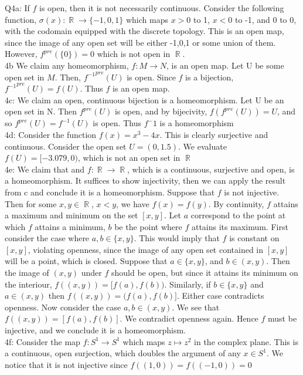 \documentclass[letterpaper]{article}
\DeclareMathOperator{\R}{\mathbb{R}}
\begin{document}
\noindent Q4a:
If $f$ is open, then it is not necessarily continuous. Consider the following function, $\sigma(x):\R \rightarrow \{-1,0,1\}$ which maps $x>0$ to 1, $x<0$ to -1, and 0 to 0, with the codomain equipped with the discrete topology. 
This is an open map, since the image of any open set will be either -1,0,1 or some union of them. However, $f^{pre}(\{ 0 \}) = 0$ which is not open in $\R$. 
\newline \\ 4b
We claim any homeomorphism, $f: M\rightarrow N$, is an open map. Let U be some open set in $M$. Then, ${f^{-1}}^{pre}(U)$ is open. Since $f$ is a bijection, ${f^{-1}}^{pre}(U)= f(U)$. Thus $f$ is an open map. 
\newline \\ 4c: 
We claim an open, continuous bijection is a homeomorphism. Let U be an open set in N. Then $f^{pre}(U)$ is open, and by bijecivity, $f(f^{pre}(U))=U$, and so $f^{pre}(U)=f^{-1}(U)$ is open. Thus $f^-1$ is a homeomorphism
\newline \\ 4d: Consider the function $f(x)= x^3-4x$. This is clearly surjective and continuous. Consider the open set $U=(0,1.5)$. We evaluate $f(U)= [-3.079,0)$, which is not an open set in $\R$
\newline \\ 4e: We claim that and $f:\R \rightarrow \R$, which is a continuous, surjective and open, is a homeomorphism. It suffices to show injectivity, then we can apply the result from c and conclude it is a homeomorphism. Suppose that $f$ is not injective. Then for some $x,y\in \R$, $x<y$, we have $f(x)=f(y)$.
By continuity, $f$ attains a maximum and minimum on the set $[x,y]$. Let $a$ correspond to the point at which $f$ attains a minimum, $b$ be the point where $f$ attains its maximum. First consider the case where $a,b\in \{x,y\}$. This would imply that $f$ is constant on $[x,y]$, violating openness, since the image of any open set contained in $[x,y]$ will be a point, which is closed. 
Suppose that $a\in \{x,y\}$, and $b\in (x,y)$. Then the image of $(x,y)$ under $f$ should be open, but since it attains its minimum on the interiour, $f((x,y)) = [f(a),f(b))$. Similarly, if $b\in \{x,y\}$ and $a\in(x,y)$ then $f((x,y)) = (f(a),f(b)]$. Either case contradicts openness. Now consider the case $a,b\in(x,y)$. We see that $f((x,y))=[f(a),f(b)]$. We contradict openness again. 
Hence $f$ must be injective, and we conclude it is a homeomorphism.
\newline \\ 4f: Consider the map $f:S^1\rightarrow S^1$ which maps $z\mapsto z^2$ in the complex plane. This is a continuous, open surjection, which doubles the argument of any $x\in S^1$. We notice that it is not injective since $f((1,0)) = f((-1,0))=0$ 
\end{document}
